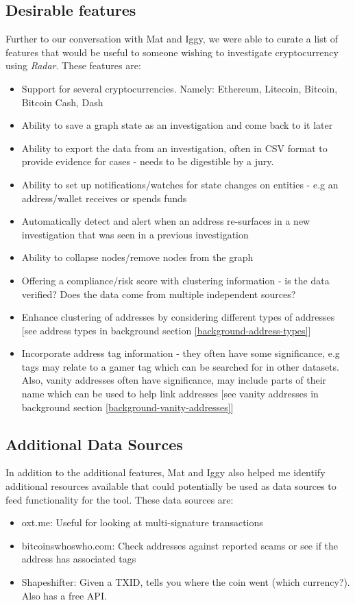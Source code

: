 \subsection{Desirable features}
Further to our conversation with Mat and Iggy, we were able to curate a list of features that would be useful to someone wishing to investigate cryptocurrency using \textit{Radar}. These features are:
\begin{itemize}
    \item Support for several cryptocurrencies. Namely: Ethereum, Litecoin, Bitcoin, Bitcoin Cash, Dash
    \item Ability to save a graph state as an investigation and come back to it later
    \item Ability to export the data from an investigation, often in CSV format to provide evidence for cases - needs to be digestible by a jury.
    \item Ability to set up notifications/watches for state changes on entities - e.g an address/wallet receives or spends funds 
    \item Automatically detect and alert when an address re-surfaces in a new investigation that was seen in a previous investigation 
    \item Ability to collapse nodes/remove nodes from the graph 
    \item Offering a compliance/risk score with clustering information - is the data verified? Does the data come from multiple independent sources? 
    \item Enhance clustering of addresses by considering different types of addresses [see address types in background section \ref{background-address-types}]
    \item Incorporate address tag information - they often have some significance, e.g tags may relate to a gamer tag which can be searched for in other datasets. Also, vanity addresses often have significance, may include parts of their name which can be used to help link addresses [see vanity addresses in background section \ref{background-vanity-addresses}]
\end{itemize}

\subsection{Additional Data Sources}
In addition to the additional features, Mat and Iggy also helped me identify additional resources available that could potentially be used as data sources to feed functionality for the tool. These data sources are:
\begin{itemize}
    \item oxt.me: Useful for looking at multi-signature transactions
    \item bitcoinswhoswho.com: Check addresses against reported scams or see if the address has associated tags
    \item Shapeshifter: Given a TXID, tells you where the coin went (which currency?). Also has a free API.
\end{itemize}

